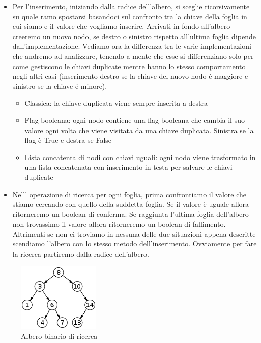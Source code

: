\begin{itemize}
  \item Per l'inserimento, iniziando dalla radice dell'albero, si sceglie ricorsivamente su quale ramo spostarsi basandoci sul confronto tra la chiave della foglia in cui
  siamo e il valore che vogliamo inserire. Arrivati in fondo all'albero creeremo un nuovo nodo, se destro o sinistro rispetto all'ultima foglia dipende 
  dall'implementazione.
  Vediamo ora la differenza tra le varie implementazioni che andremo ad analizzare, tenendo a mente che esse si differenziano solo per come gestiscono le chiavi    
  duplicate mentre hanno lo stesso comportamento negli altri casi (inserimento destro se la chiave del nuovo nodo é maggiore e sinistro se la chiave é minore).
    \begin{itemize}
      \item Classica: la chiave duplicata viene sempre inserita a destra
      \item Flag booleana: ogni nodo contiene una flag booleana che cambia il suo valore ogni volta che viene visitata da una chiave duplicata. Sinistra se la flag è True e destra se False
      \item Lista concatenta di nodi con chiavi uguali: ogni nodo viene trasformato in una lista concatenata con inserimento in testa per salvare le chiavi duplicate
    \end{itemize}
  \item Nell' operazione di ricerca per ogni foglia, prima confrontiamo il valore che stiamo cercando con quello della suddetta foglia. Se il valore è uguale allora ritorneremo
  un boolean di conferma. Se raggiunta l'ultima foglia dell'albero non trovassimo il valore allora ritorneremo un boolean di fallimento. Altrimenti se non ci
  troviamo in nessuna delle due situazioni appena descritte scendiamo l'albero con lo stesso metodo dell'inserimento. Ovviamente per fare la ricerca partiremo
  dalla radice dell'albero.
\end{itemize}

\begin{figure}[H]
  \centering
  \includegraphics[width=0.35\textwidth]{Resources/ABR_Resources/ABR.png}
  \caption{Albero binario di ricerca}
  \label{fig:ABR}
\end{figure}

